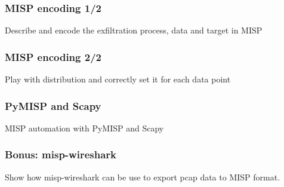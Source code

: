 \begin{frame}[fragile]
    \frametitle{MISP encoding 1/2}
    Describe and encode the exfiltration process, data and target in MISP
    \note[item]{}
\end{frame}

\begin{frame}[fragile]
    \frametitle{MISP encoding 2/2}
    Play with distribution and correctly set it for each data point
    \note[item]{}
\end{frame}

\begin{frame}[fragile]
    \frametitle{PyMISP and Scapy}
    MISP automation with PyMISP and Scapy
    \note[item]{}
\end{frame}

\begin{frame}[fragile]
    \frametitle{Bonus: misp-wireshark}
    Show how misp-wireshark can be use to export pcap data to MISP format.
    \note[item]{}
\end{frame}
